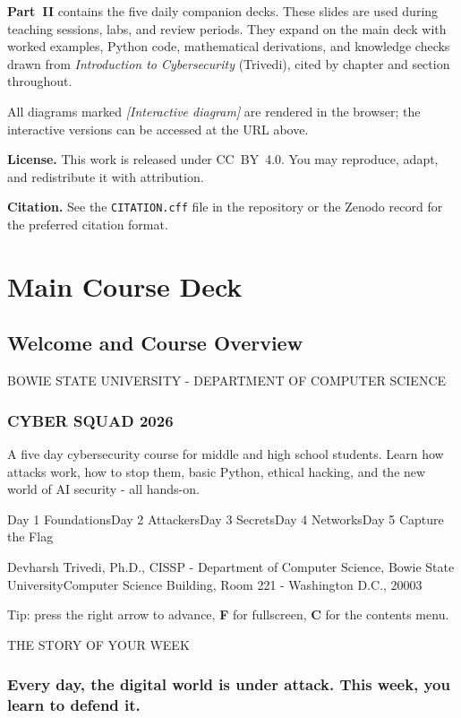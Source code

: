 \documentclass[12pt,openany]{book}
\begin{document}
\textbf{Part~II} contains the five daily companion decks. These slides are used during
teaching sessions, labs, and review periods. They expand on the main deck with worked
examples, Python code, mathematical derivations, and knowledge checks drawn from
\textit{Introduction to Cybersecurity} (Trivedi), cited by chapter and section throughout.

All diagrams marked \textit{[Interactive diagram]} are rendered in the browser;
the interactive versions can be accessed at the URL above.

\vspace{1em}
\noindent\textbf{License.} This work is released under CC~BY~4.0. You may reproduce,
adapt, and redistribute it with attribution.

\vspace{1em}
\noindent\textbf{Citation.} See the \texttt{CITATION.cff} file in the repository or
the Zenodo record for the preferred citation format.

\tableofcontents
\mainmatter
\part{Main Course Deck}
\chapter{Welcome and Course Overview}
BOWIE STATE UNIVERSITY - DEPARTMENT OF COMPUTER SCIENCE


\section*{CYBER SQUAD 2026}


A five day cybersecurity course for middle and high school students. Learn how attacks work, how to stop them, basic Python, ethical hacking, and the new world of AI security - all hands-on.

Day 1 FoundationsDay 2 AttackersDay 3 SecretsDay 4 NetworksDay 5 Capture the Flag


Devharsh Trivedi, Ph.D., CISSP - Department of Computer Science, Bowie State UniversityComputer Science Building, Room 221 - Washington D.C., 20003


Tip: press the right arrow to advance, \textbf{F} for fullscreen, \textbf{C} for the contents menu.



THE STORY OF YOUR WEEK


\section*{Every day, the digital world is under attack. This week, you learn to defend it.}
\end{document}
